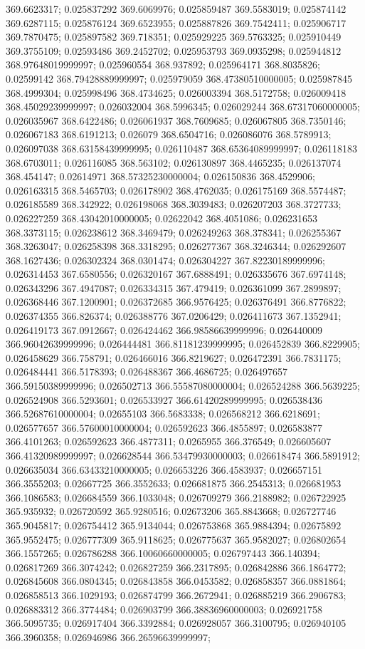 369.6623317; 0.025837292 369.6069976; 0.025859487 369.5583019; 0.025874142 369.6287115; 0.025876124 369.6523955; 0.025887826 369.7542411; 0.025906717 369.7870475; 0.025897582 369.718351; 0.025929225 369.5763325; 0.025910449 369.3755109; 0.02593486 369.2452702; 0.025953793 369.0935298; 0.025944812 368.97648019999997; 0.025960554 368.937892; 0.025964171 368.8035826; 0.02599142 368.79428889999997; 0.025979059 368.47380510000005; 0.025987845 368.4999304; 0.025998496 368.4734625; 0.026003394 368.5172758; 0.026009418 368.45029239999997; 0.026032004 368.5996345; 0.026029244 368.67317060000005; 0.026035967 368.6422486; 0.026061937 368.7609685; 0.026067805 368.7350146; 0.026067183 368.6191213; 0.026079 368.6504716; 0.026086076 368.5789913; 0.026097038 368.63158439999995; 0.026110487 368.65364089999997; 0.026118183 368.6703011; 0.026116085 368.563102; 0.026130897 368.4465235; 0.026137074 368.454147; 0.02614971 368.57325230000004; 0.026150836 368.4529906; 0.026163315 368.5465703; 0.026178902 368.4762035; 0.026175169 368.5574487; 0.026185589 368.342922; 0.026198068 368.3039483; 0.026207203 368.3727733; 0.026227259 368.43042010000005; 0.02622042 368.4051086; 0.026231653 368.3373115; 0.026238612 368.3469479; 0.026249263 368.378341; 0.026255367 368.3263047; 0.026258398 368.3318295; 0.026277367 368.3246344; 0.026292607 368.1627436; 0.026302324 368.0301474; 0.026304227 367.82230189999996; 0.026314453 367.6580556; 0.026320167 367.6888491; 0.026335676 367.6974148; 0.026343296 367.4947087; 0.026334315 367.479419; 0.026361099 367.2899897; 0.026368446 367.1200901; 0.026372685 366.9576425; 0.026376491 366.8776822; 0.026374355 366.826374; 0.026388776 367.0206429; 0.026411673 367.1352941; 0.026419173 367.0912667; 0.026424462 366.98586639999996; 0.026440009 366.96042639999996; 0.026444481 366.81181239999995; 0.026452839 366.8229905; 0.026458629 366.758791; 0.026466016 366.8219627; 0.026472391 366.7831175; 0.026484441 366.5178393; 0.026488367 366.4686725; 0.026497657 366.59150389999996; 0.026502713 366.55587080000004; 0.026524288 366.5639225; 0.026524908 366.5293601; 0.026533927 366.61420289999995; 0.026538436 366.52687610000004; 0.02655103 366.5683338; 0.026568212 366.6218691; 0.026577657 366.57600010000004; 0.026592623 366.4855897; 0.026583877 366.4101263; 0.026592623 366.4877311; 0.0265955 366.376549; 0.026605607 366.41320989999997; 0.026628544 366.53479930000003; 0.026618474 366.5891912; 0.026635034 366.63433210000005; 0.026653226 366.4583937; 0.026657151 366.3555203; 0.02667725 366.3552633; 0.026681875 366.2545313; 0.026681953 366.1086583; 0.026684559 366.1033048; 0.026709279 366.2188982; 0.026722925 365.935932; 0.026720592 365.9280516; 0.02673206 365.8843668; 0.026727746 365.9045817; 0.026754412 365.9134044; 0.026753868 365.9884394; 0.02675892 365.9552475; 0.026777309 365.9118625; 0.026775637 365.9582027; 0.026802654 366.1557265; 0.026786288 366.10060660000005; 0.026797443 366.140394; 0.026817269 366.3074242; 0.026827259 366.2317895; 0.026842886 366.1864772; 0.026845608 366.0804345; 0.026843858 366.0453582; 0.026858357 366.0881864; 0.026858513 366.1029193; 0.026874799 366.2672941; 0.026885219 366.2906783; 0.026883312 366.3774484; 0.026903799 366.38836960000003; 0.026921758 366.5095735; 0.026917404 366.3392884; 0.026928057 366.3100795; 0.026940105 366.3960358; 0.026946986 366.26596639999997; 